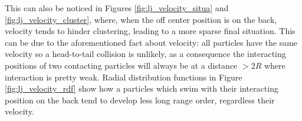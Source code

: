 \documentclass[../../master_thesis_np.tex]{subfiles}
\begin{document}
		This can also be noticed in Figures \ref{fig:lj_velocity_situa} and \ref{fig:lj_velocity_cluster}, where, when the off center position is on the back, velocity tends to hinder clustering, leading to a more sparse final situation. 
		This can be due to the aforementioned fact about velocity: all particles have the same velocity so a head-to-tail collision is unlikely, as a consequence the interacting positions of two contacting particles will always be at a distance $>2R$ where interaction is pretty weak.
		Radial distribution functions in Figure \ref{fig:lj_velocity_rdf} show how a particles which swim with their interacting position on the back tend to develop less long range order, regardless their velocity.
		
		\begin{figure}[htp]
			\centering\
			\\

\end{figure}
\end{document}

